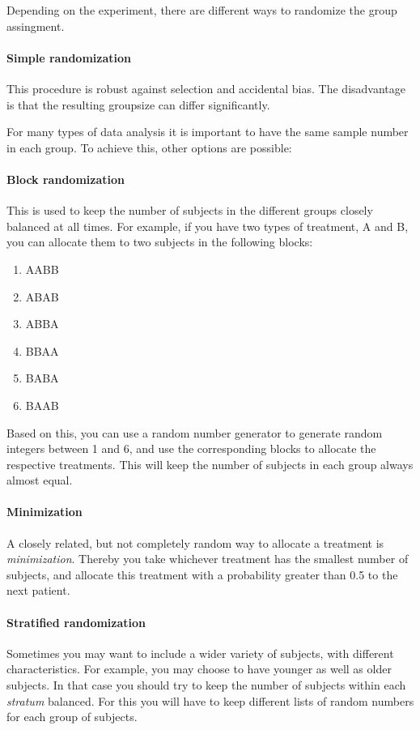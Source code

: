 Depending on the experiment, there are different ways to randomize the group assingment.

\paragraph{Simple randomization}
This procedure is robust against selection and accidental bias. The disadvantage is that the resulting groupsize can differ significantly.

For many types of data analysis it is important to have the same sample number in each group. To achieve this, other options are possible:

\paragraph{Block randomization}
This is used to keep the number of subjects in the different groups closely balanced at all times. For example, if you have two types of treatment, A and B, you can allocate them to two subjects in the following blocks:

\begin{enumerate}
  \item AABB
  \item ABAB
  \item ABBA
  \item BBAA
  \item BABA
  \item BAAB
\end{enumerate}

Based on this, you can use a random number generator to generate random integers between 1 and 6, and use the corresponding blocks to allocate the respective treatments. This will keep the number of subjects in each group always almost equal.

\paragraph{Minimization}
A closely related, but not completely random way to allocate a treatment is \emph{minimization}. Thereby you take whichever treatment has the smallest number of subjects, and allocate this treatment with a probability greater than 0.5 to the next patient.

\paragraph{Stratified randomization}
Sometimes you may want to include a wider variety of subjects, with different characteristics. For example, you may choose to have younger as well as older subjects. In that case you should try to keep the number of subjects within each \emph{stratum} balanced. For this you will have to keep different lists of random numbers for each group of subjects.

